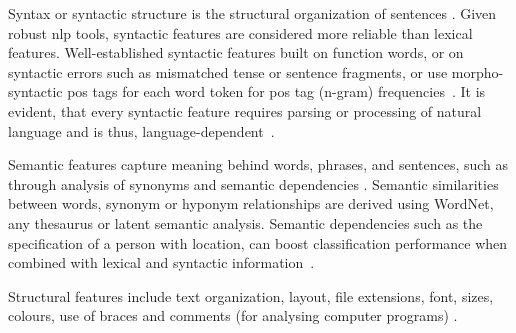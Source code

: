 \begin{table}[]
\centering
\caption{Comparison of a subset of lexical features~\citep{stamatatos_survey_2009}. Requirements refer to computational requirements such as a tokenizer.}
\label{tab:comp_lexical}
\end{table}

Syntax or syntactic structure is the structural organization of sentences \citep{kurt_pehlivanoglu_comparative_2024}.
Given robust \ac{nlp} tools, syntactic features are considered more reliable than lexical features.
Well-established syntactic features built on function words, or on syntactic errors such as mismatched tense or sentence fragments, or use morpho-syntactic \ac{pos} tags for each word token for \ac{pos} tag (n-gram) frequencies~\citep{abbasi_writeprints_2008,stamatatos_survey_2009}.
It is evident, that every syntactic feature requires parsing or processing of natural language and is thus, language-dependent~\citep{neal_surveying_2018,stamatatos_survey_2009}.



Semantic features capture meaning behind words, phrases, and sentences, such as through analysis of synonyms and semantic dependencies \citep{neal_surveying_2018}.
Semantic similarities between words, synonym or hyponym relationships are derived using WordNet, any thesaurus or latent semantic analysis.
Semantic dependencies such as the specification of a person with location, can boost classification performance when combined with lexical and syntactic information~\cite{stamatatos_survey_2009}.

\begin{definition}
    Structural features include text organization, layout, file extensions, font, sizes, colours, 
    use of braces and comments (for analysing computer programs) \citep{abbasi_writeprints_2008,neal_surveying_2018}.
\end{definition}

